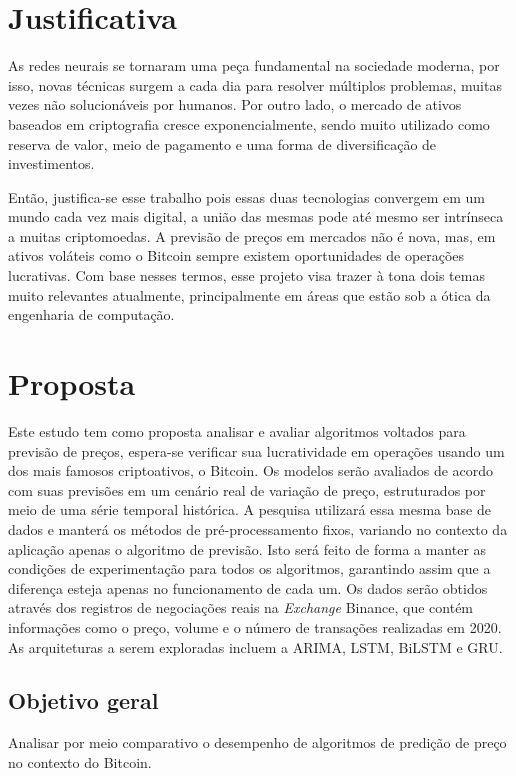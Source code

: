 \section{Justificativa}
As redes neurais se tornaram uma peça fundamental na sociedade moderna,
por isso, novas técnicas surgem a cada dia para resolver múltiplos problemas, 
muitas vezes não solucionáveis por humanos.
Por outro lado, o mercado de ativos baseados em criptografia cresce exponencialmente, 
sendo muito utilizado como reserva de valor, meio de pagamento e uma forma de diversificação de investimentos.

Então, justifica-se esse trabalho pois essas duas tecnologias convergem
em um mundo cada vez mais digital, a união das mesmas pode até mesmo ser intrínseca a muitas criptomoedas.
A previsão de preços em mercados não é nova, mas, em ativos voláteis como o Bitcoin sempre existem oportunidades de operações lucrativas. 
Com base nesses termos, esse projeto visa trazer à tona dois temas muito relevantes atualmente, principalmente em áreas que estão sob a ótica da engenharia de computação.


\section{Proposta}

Este estudo tem como proposta analisar e avaliar algoritmos voltados para previsão de preços, espera-se verificar sua lucratividade em operações usando um dos mais famosos criptoativos, o Bitcoin.
Os modelos serão avaliados de acordo com suas previsões em um cenário real de variação de preço, estruturados por meio de uma série temporal histórica. A pesquisa utilizará essa mesma base de dados e manterá os métodos de pré-processamento fixos, variando no contexto da aplicação apenas o algoritmo de previsão.
Isto será feito de forma a manter as condições de experimentação para todos os algoritmos, garantindo assim que a diferença esteja apenas no funcionamento de cada um.
Os dados serão obtidos através dos registros de negociações reais na \textit{Exchange}
 Binance, que contém informações como o preço, volume e o número de transações realizadas em 2020.
As arquiteturas a serem exploradas incluem a ARIMA, LSTM, BiLSTM e GRU.

\subsection{Objetivo geral}

Analisar por meio comparativo o desempenho de algoritmos de predição de preço no contexto do Bitcoin.

